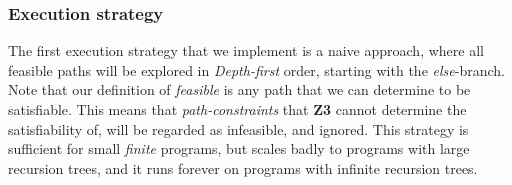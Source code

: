 \subsubsection{Execution strategy}
The first execution strategy that we implement is a naive approach, where all feasible paths will be explored in \emph{Depth-first} order, starting with the \emph{else}-branch. Note that our definition of \emph{feasible} is any path that we can determine to be satisfiable. This means that \emph{path-constraints} that \textbf{Z3} cannot determine the satisfiability of, will be regarded as infeasible, and ignored.
This strategy is sufficient for small \emph{finite} programs, but scales badly to programs with large recursion trees, and it runs forever on programs with infinite recursion trees. 
